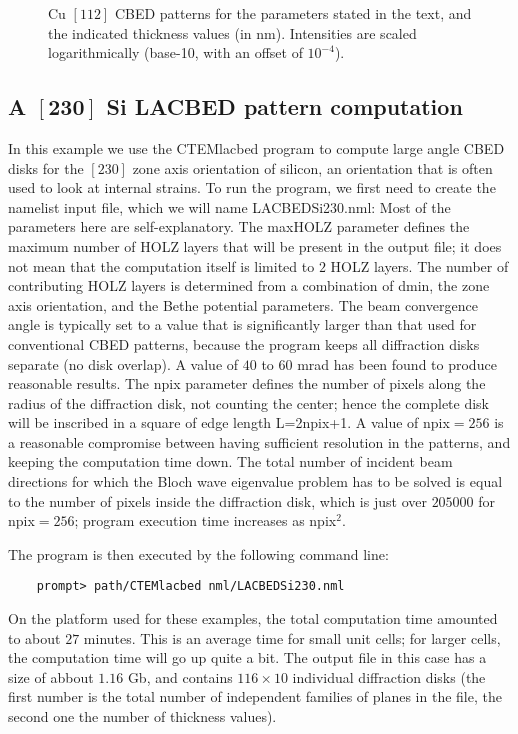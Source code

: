 \documentclass[DIV=calc, paper=letter, fontsize=11pt]{scrartcl}	 %
\begin{document}
\begin{figure}[h]
\leavevmode\centering
{}
\caption{\label{fig:ex1}Cu $[112]$ CBED patterns for the parameters stated in the text, and the indicated thickness values (in nm).  Intensities are 
scaled logarithmically (base-10, with an offset of $10^{-4}$).}
\end{figure}



\subsection{A $\mathbf{[230]}$ Si LACBED pattern computation\label{sec:example2}}
In this example we use the \textsf{CTEMlacbed} program to compute large angle CBED disks
for the $[230]$ zone axis orientation of silicon, an orientation that is often used to look at 
internal strains.  To run the program, we first need to create the namelist input file, which we 
will name \textsf{LACBEDSi230.nml}:
Most of the parameters here are self-explanatory. The \textsf{maxHOLZ} parameter defines the maximum number of 
HOLZ layers that will be present in the output file;  it does not mean that the computation itself is limited to $2$ HOLZ layers.
The number of contributing HOLZ layers is determined from a combination of \textsf{dmin}, the zone axis orientation, and
the Bethe potential parameters.  The beam convergence angle is typically set to a value that is significantly larger
than that used for conventional CBED patterns, because the program keeps all diffraction disks
separate (no disk overlap).  A value of $40$ to $60$ mrad has been found to produce reasonable results.  The \textsf{npix} parameter
defines the number of pixels along the radius of the diffraction disk, not counting the center; hence the complete disk will be
inscribed in a square of edge length L=2\textsf{npix}+1.  A value of \textsf{npix}$=256$ is a reasonable compromise between having
sufficient resolution in the patterns, and keeping the computation time down.  The total number of incident beam directions for which
the Bloch wave eigenvalue problem has to be solved is equal to the number of pixels inside the diffraction disk, which is just over 
$205000$ for \textsf{npix}$=256$; program execution time increases as \textsf{npix}$^2$. 

The program is then executed by the following command line:
\begin{verbatim}
	prompt> path/CTEMlacbed nml/LACBEDSi230.nml
\end{verbatim}
On the platform used for these examples, the total computation time amounted to about $27$ minutes.  This is an average time for small unit
cells;  for larger cells, the computation time will go up quite a bit.  The output file in this case has a size of abbout $1.16$ Gb, and contains
$116\times 10$ individual diffraction disks (the first number is the total number of independent families of planes in the file, the 
second one the number of thickness values).
\end{document}
